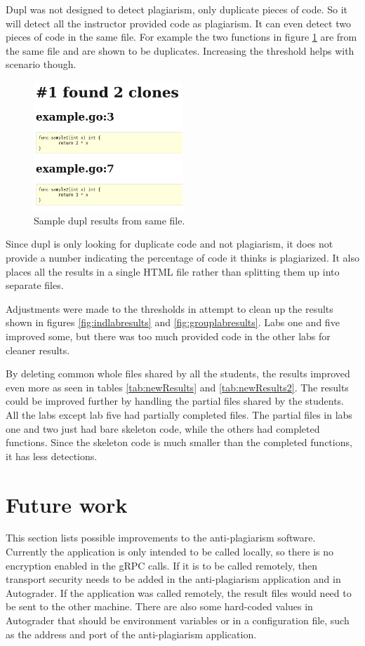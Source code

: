 \documentclass[10pt,journal,compsoc]{IEEEtran}
\begin{document}
	Dupl was not designed to detect plagiarism, only duplicate pieces of code. So it will detect all the instructor provided code as plagiarism. It can even detect two pieces of code in the same file. For example the two functions in figure \ref{fig:duplSameFile} are from the same file and are shown to be duplicates. Increasing the threshold helps with scenario though.
	
	\begin{figure}[h!]
		\includegraphics[width=0.5\textwidth]{duplSameFile2.png}
		\caption{Sample dupl results from same file.}
		\label{fig:duplSameFile}
	\end{figure}
	
	Since dupl is only looking for duplicate code and not plagiarism, it does not provide a number indicating the percentage of code it thinks is plagiarized. It also places all the results in a single HTML file rather than splitting them up into separate files.
	
	Adjustments were made to the thresholds in attempt to clean up the results shown in figures \ref{fig:indlabresults} and \ref{fig:grouplabresults}. Labs one and five improved some, but there was too much provided code in the other labs for cleaner results.
	
	By deleting common whole files shared by all the students, the results improved even more as seen in tables \ref{tab:newResults} and \ref{tab:newResults2}. The results could be improved further by handling the partial files shared by the students. All the labs except lab five had partially completed files. The partial files in labs one and two just had bare skeleton code, while the others had completed functions. Since the skeleton code is much smaller than the completed functions, it has less detections.
	
	\section{Future work}
	This section lists possible improvements to the anti-plagiarism software. Currently the application is only intended to be called locally, so there is no encryption enabled in the gRPC calls. If it is to be called remotely, then transport security needs to be added in the anti-plagiarism application and in Autograder. If the application was called remotely, the result files would need to be sent to the other machine. There are also some hard-coded values in Autograder that should be environment variables or in a configuration file, such as the address and port of the anti-plagiarism application.
	
\end{document}

